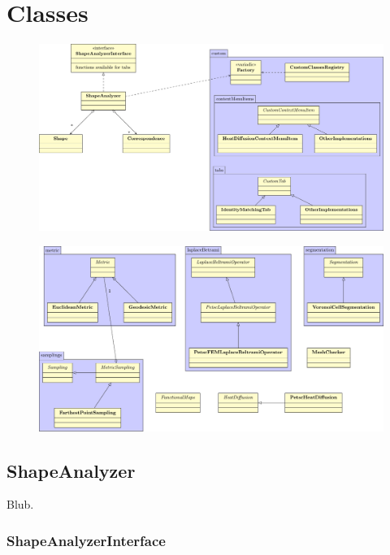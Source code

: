 
\chapter{Classes}

\begin{figure}[h]
	\centering
	\includegraphics[width=\textwidth]{images/diagram.pdf}
\end{figure}

\begin{figure}[h]
	\centering
	\includegraphics[width=\textwidth]{images/diagram2.pdf}
\end{figure}

\section{ShapeAnalyzer}
\label{sec:ShapeAnalyzer}

Blub.

\subsection{ShapeAnalyzerInterface}
\label{subsec:ShapeAnalyzerInterface}

